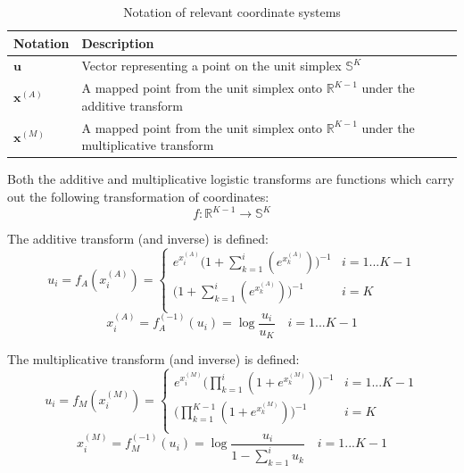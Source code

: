 \begin{table}[H]
    \begin{center}
    \begin{tabular}{@{}ll@{}}
    \toprule
    \textbf{Notation} & \textbf{Description} \\ \midrule
        \(\mathbf{u}\)  & Vector representing a point on the unit simplex \(\mathbb{S}^{K}\)   \\
        \(\mathbf{x}^{(A)}\) & A mapped point from the unit simplex onto \(\mathbb{R}^{K-1}\) under the additive transform\\
        \(\mathbf{x}^{(M)}\)  & A mapped point from the unit simplex onto \(\mathbb{R}^{K-1}\) under the multiplicative transform\\ \bottomrule
    \end{tabular}
    \end{center}
    \caption{Notation of relevant coordinate systems}
\end{table}

Both the additive and multiplicative logistic transforms are functions which carry out the following transformation of coordinates:
\[f : \mathbb{R}^{K-1} \rightarrow \mathbb{S}^{K}\]

The additive transform (and inverse) is defined:
\begin{equation}\label{eq:fwd_transform_add}
    u_i = f_{A}(x^{(A)}_i) = 
    \begin{cases}
    e^{x^{(A)}_i} \bigg( 1 + \sum_{k=1}^{i} (e^{x^{(A)}_k}) \bigg)^{-1} & i=1...K-1 \\
    \bigg( 1 + \sum_{k=1}^{i} (e^{x^{(A)}_k}) \bigg)^{-1} & i=K \\
    \end{cases}
\end{equation} 
\begin{equation}\label{eq:inv_transform_add}
    x^{(A)}_i = f_{A}^{(-1)}(u_i) = 
    \log \frac{u_i}{u_K } \quad i=1...K-1
\end{equation} 

The multiplicative transform (and inverse) is defined:
\begin{equation}\label{eq:fwd_transform_mult}
    u_i = f_{M}(x^{(M)}_i) = 
    \begin{cases}
    e^{x^{(M)}_i} \bigg( \prod_{k=1}^{i} (1+e^{x^{(M)}_k}) \bigg)^{-1} & i=1...K-1 \\
    \bigg( \prod_{k=1}^{K-1} (1+e^{x^{(M)}_k}) \bigg)^{-1} & i=K \\
    \end{cases}
\end{equation} 
\begin{equation}\label{eq:inv_transform_mult}
    x^{(M)}_i = f_{M}^{(-1)}(u_i) = 
    \log \frac{u_i}{ 1- \sum_{k=1}^{i} u_k } \quad i=1...K-1
\end{equation} 

